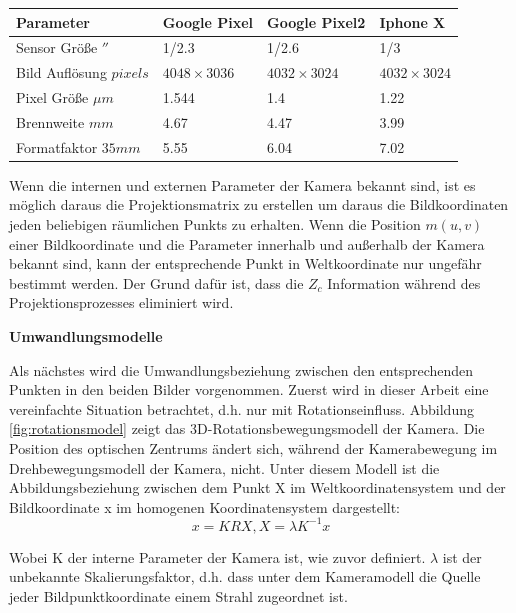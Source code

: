 \begin{table}[htb]
	\label{tbl:Parameter der Kameras im Vergleich}
	\footnotesize
	\centering
	\begin{tabular}{|p{3cm}|p{2.5cm}|p{2.5cm}|p{2.5cm}|}	%
	\toprule
	\textbf{Parameter} & \textbf{Google Pixel} & \textbf{Google Pixel2} & \textbf{Iphone X}\\
	\midrule
	Sensor Größe $''$ & 1/2.3 & 1/2.6 & 1/3 \\
	Bild Auflösung $pixels$ & $4048 \times 3036$ & $4032 \times 3024$ & $4032 \times 3024$ \\
	Pixel Größe $\mu m$ & 1.544 & 1.4 & 1.22 \\	
	Brennweite $mm$ & 4.67 & 4.47 & 3.99 \\
	Formatfaktor $35 mm$  	&5.55	&6.04	&7.02	\\
	
	\bottomrule
	\end{tabular}
\end{table} 


Wenn die internen und externen Parameter der Kamera bekannt sind, ist es möglich daraus die Projektionsmatrix zu erstellen um daraus die Bildkoordinaten jeden beliebigen räumlichen Punkts zu erhalten. Wenn die Position $m(u,v)$ einer Bildkoordinate und die Parameter innerhalb und außerhalb der Kamera bekannt sind, kann der entsprechende Punkt in Weltkoordinate nur ungefähr bestimmt werden. Der Grund dafür ist, dass die $Z_c$ Information während des Projektionsprozesses eliminiert wird. 

\textbf{Umwandlungsmodelle}

Als nächstes wird die Umwandlungsbeziehung zwischen den entsprechenden Punkten in den beiden Bilder vorgenommen. Zuerst wird in dieser Arbeit eine vereinfachte Situation betrachtet, d.h. nur mit Rotationseinfluss\cite{Rotation}. Abbildung \ref{fig:rotationsmodel} zeigt das 3D-Rotationsbewegungsmodell der Kamera. Die Position des optischen Zentrums ändert sich, während der Kamerabewegung im Drehbewegungsmodell der Kamera, nicht. Unter diesem Modell ist die Abbildungsbeziehung zwischen dem Punkt X im Weltkoordinatensystem und der Bildkoordinate x im homogenen Koordinatensystem dargestellt: 
\begin{equation}
   x = KRX, X = \lambda  K^{-1} x
\end{equation}

Wobei K der interne Parameter der Kamera ist, wie zuvor definiert. $\lambda$ ist der unbekannte Skalierungsfaktor, d.h. dass unter dem Kameramodell die Quelle jeder Bildpunktkoordinate einem Strahl zugeordnet ist.

